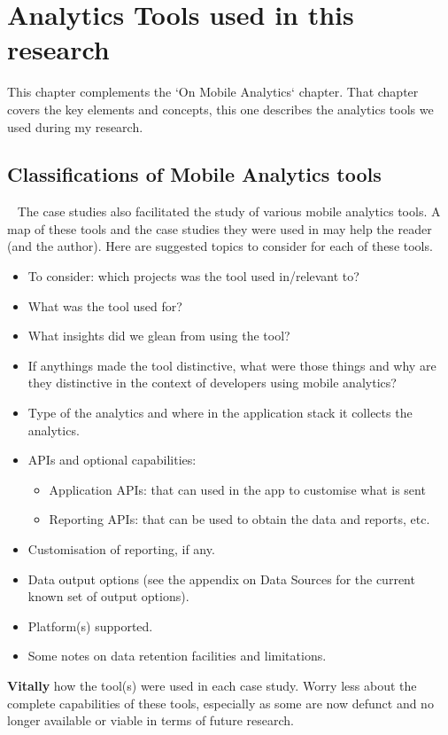 \chapter{Analytics Tools used in this research}
\label{appendix-analytics-tools}

This chapter complements the `On Mobile Analytics` chapter. That chapter covers the key elements and concepts, this one describes the analytics tools we used during my research.


\section{Classifications of Mobile Analytics tools}~\label{classifications-of-mobile-analytics-tools-used-in-this-research}
The case studies also facilitated the study of various mobile analytics tools. A map of these tools and the case studies they were used in may help the reader (and the author). Here are suggested topics to consider for each of these tools.
\begin{itemize}
    \itemsep0em
    \item To consider: which projects was the tool used in/relevant to?
    \item What was the tool used for?
    \item What insights did we glean from using the tool?
    \item If anythings made the tool distinctive, what were those things and why are they distinctive in the context of developers using mobile analytics?
    \item Type of the analytics and where in the application stack it collects the analytics.
    \item APIs and optional capabilities:
    \begin{itemize}
        \item Application APIs: that can used in the app to customise what is sent
        \item Reporting APIs: that can be used to obtain the data and reports, etc. 
    \end{itemize}
    \item Customisation of reporting, if any.
    \item Data output options (see the appendix on Data Sources for the current known set of output options).
    \item Platform(s) supported.
    \item Some notes on data retention facilities and limitations.
\end{itemize}
\textbf{Vitally} how the tool(s) were used in each case study. Worry less about the complete capabilities of these tools, especially as some are now defunct and no longer available or viable in terms of future research.

